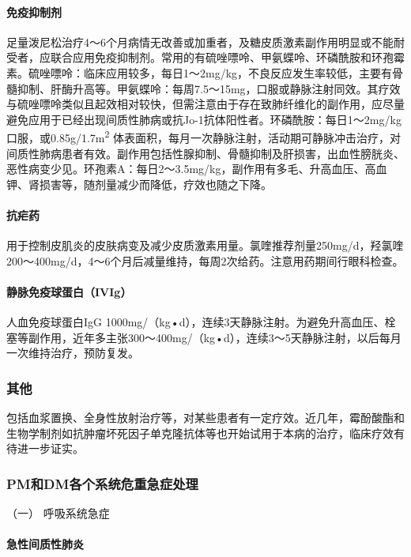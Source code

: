 \paragraph{免疫抑制剂}

足量泼尼松治疗4～6个月病情无改善或加重者，及糖皮质激素副作用明显或不能耐受者，应联合应用免疫抑制剂。常用的有硫唑嘌呤、甲氨蝶呤、环磷酰胺和环孢霉素。硫唑嘌呤：临床应用较多，每日1～2mg/kg，不良反应发生率较低，主要有骨髓抑制、肝酶升高等。甲氨蝶呤：每周7.5～15mg，口服或静脉注射同效。其疗效与硫唑嘌呤类似且起效相对较快，但需注意由于存在致肺纤维化的副作用，应尽量避免应用于已经出现间质性肺病或抗Jo-1抗体阳性者。环磷酰胺：每日1～2mg/kg口服，或0.85g/1.7m\textsuperscript{2}
体表面积，每月一次静脉注射，活动期可静脉冲击治疗，对间质性肺病患者有效。副作用包括性腺抑制、骨髓抑制及肝损害，出血性膀胱炎、恶性病变少见。环孢素A：每日2～3.5mg/kg，副作用有多毛、升高血压、高血钾、肾损害等，随剂量减少而降低，疗效也随之下降。

\paragraph{抗疟药}

用于控制皮肌炎的皮肤病变及减少皮质激素用量。氯喹推荐剂量250mg/d，羟氯喹200～400mg/d，4～6个月后减量维持，每周2次给药。注意用药期间行眼科检查。

\paragraph{静脉免疫球蛋白（IVIg）}

人血免疫球蛋白IgG
1000mg/（kg•d），连续3天静脉注射。为避免升高血压、栓塞等副作用，近年多主张300～400mg/（kg•d），连续3～5天静脉注射，以后每月一次维持治疗，预防复发。

\subsubsection{其他}

包括血浆置换、全身性放射治疗等，对某些患者有一定疗效。近几年，霉酚酸酯和生物学制剂如抗肿瘤坏死因子单克隆抗体等也开始试用于本病的治疗，临床疗效有待进一步证实。

\subsubsection{PM和DM各个系统危重急症处理}

\hypertarget{text00350.htmlux5cux23CHP14-3-3-4-1}{}
（一） 呼吸系统急症

\paragraph{急性间质性肺炎}

